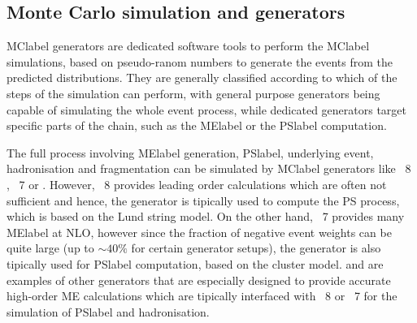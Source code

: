\subsection{Monte Carlo simulation and generators}

\acrshort{MClabel} generators are dedicated software tools to perform the \acrshort{MClabel} simulations, based on pseudo-ranom numbers to generate the events from the predicted distributions. They are generally classified according to which of the steps of the simulation can perform, with general purpose generators being capable of simulating the whole event process, while dedicated generators target specific parts of the chain, such as the \acrshort{MElabel} or the \acrshort{PSlabel} computation.

The full process involving \acrshort{MElabel} generation, \acrshort{PSlabel}, underlying event, hadronisation and fragmentation can be simulated by \acrshort{MClabel} generators like \PYTHIA~8 %
, \HERWIG~7 %
or \SHERPA %
. However, \PYTHIA~8 provides leading order calculations which are often not
sufficient and hence, the generator is tipically used to compute the \acrshort{PS} process, which is based on the Lund string model. On the other hand, \HERWIG~7 provides many \acrshort{MElabel} at NLO, however since the fraction of negative event weights can be quite large (up to $\sim40\%$ for certain generator setups), the generator is also tipically used for \acrshort{PSlabel} computation, based on the cluster model. \POWHEGBOX %
and \MGMCatNLO %
are examples of other generators that are especially designed to provide accurate high-order \acrshort{ME} calculations which are tipically interfaced with \PYTHIA~8 or \HERWIG~7 for the simulation of \acrshort{PSlabel} and hadronisation. 


